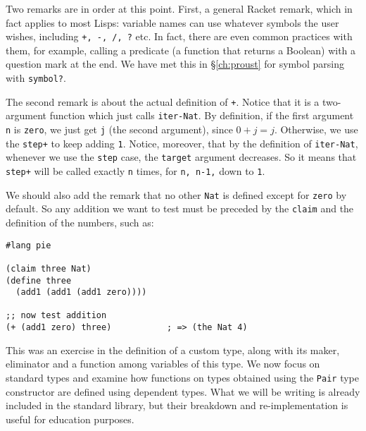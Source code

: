 Two remarks are in order at this point. First, a general Racket remark,
which in fact applies to most Lisps: variable names can use whatever
symbols the user wishes, including \texttt{+, -, /, ?} etc. In fact,
there are even common practices with them, for example, calling a predicate
(a function that returns a Boolean) with a question mark at the end. We have
met this in \S\ref{ch:proust} for symbol parsing with \texttt{symbol?}.

The second remark is about the actual definition of \texttt{+}. Notice that
it is a two-argument function which just calls \texttt{iter-Nat}. By
definition, if the first argument \texttt{n} is \texttt{zero}, we just get
\texttt{j} (the second argument), since $ 0 + j = j $. Otherwise, we use
the  \texttt{step+} to keep adding \texttt{1}. Notice,
moreover, that by the definition of \texttt{iter-Nat}, whenever we use the
\texttt{step} case, the \texttt{target} argument decreases. So it means that
\texttt{step+} will be called exactly \texttt{n} times, for \texttt{n, n-1,}
down to \texttt{1}.

We should also add the remark that no other \texttt{Nat} is defined except
for \texttt{zero} by default. So any addition we want to test must be
preceded by the \texttt{claim} and the definition of the numbers,
such as:
{
  \small
\begin{verbatim}
#lang pie

(claim three Nat)
(define three
  (add1 (add1 (add1 zero))))

;; now test addition
(+ (add1 zero) three)           ; => (the Nat 4)
\end{verbatim}
}

\vspace{0.3cm}

This was an exercise in the definition of a custom type, along with its
maker, eliminator and a function among variables of this type. We now focus
on standard types and examine how functions on types obtained using the
\texttt{Pair} type constructor are defined using dependent types.
What we will be writing is already included in the standard library, but their
breakdown and re-implementation is useful for education purposes.

